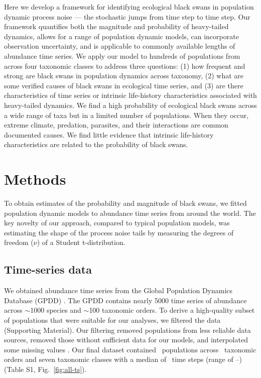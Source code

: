 Here we develop a framework for identifying ecological black swans in
population dynamic process noise --- the stochastic jumps from time step to
time step. Our framework quantifies both the magnitude and probability of
heavy-tailed dynamics, allows for a range of population dynamic models, can
incorporate observation uncertainty, and is applicable to commonly available
lengths of abundance time series. We apply our model to hundreds of populations
from across four taxonomic classes to address three questions: (1) how frequent
and strong are black swans in population dynamics across taxonomy, (2) what are
some verified causes of black swans in ecological time series, and (3) are
there characteristics of time series or intrinsic life-history characteristics
associated with heavy-tailed dynamics. We find a high probability of ecological
black swans across a wide range of taxa but in a limited number of populations.
When they occur, extreme climate, predation, parasites, and their interactions
are common documented causes. We find little evidence that intrinsic
life-history characteristics are related to the probability of black swans.

\section{Methods}

To obtain estimates of the probability and magnitude of black swans, we fitted
population dynamic models to abundance time series from around the world. The
key novelty of our approach, compared to typical population models, was
estimating the shape of the process noise tails by measuring the degrees of
freedom ($\nu$) of a Student t-distribution.

\subsection{Time-series data}

We obtained abundance time series from the Global Population Dynamics Database
(GPDD) \citep{gpdd2010}. The GPDD contains nearly 5000 time series of abundance
across $\sim$1000 species and $\sim$100 taxonomic orders. To derive
a high-quality subset of populations that were suitable for our analyses, we
filtered the data (Supporting Material). Our filtering removed populations from
less reliable data sources, removed those without sufficient data for our
models, and interpolated some missing values \citep[\textit{sensu}][]{brook2006a}.
Our final dataset contained \NPops~populations across \NOrders~taxonomic orders
and seven taxonomic classes with a median of \medianTimeSteps~time steps (range
of \minTimeSteps--\maxTimeSteps) (Table S1, Fig.~\ref{fig:all-ts}).

